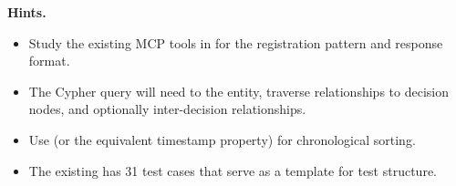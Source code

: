 \medskip\noindent\textbf{Hints.}

\begin{itemize}
    \item Study the existing MCP tools in  for the
          registration pattern and response format.
    \item The Cypher query will need to  the entity, traverse
           relationships to decision nodes, and optionally
           inter-decision relationships.
    \item Use  (or the equivalent timestamp
          property) for chronological sorting.
    \item The existing  has 31 test
          cases that serve as a template for test structure.
\end{itemize}
